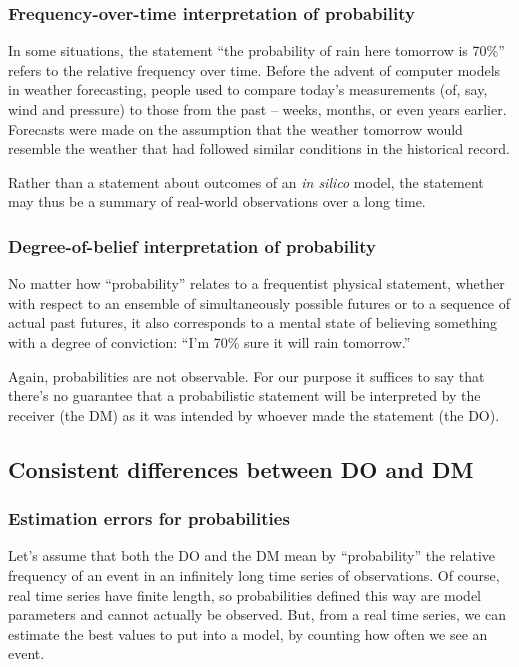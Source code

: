 \documentclass[12pt,letter,timesnewroman]{article}
\newcommand{\seclabel}[1]{\label{sec:#1}}
\begin{document}
\subsubsection*{Frequency-over-time interpretation of probability}
In some situations, the statement ``the probability of rain here tomorrow is 70\%'' refers to the relative frequency over time. Before the advent of computer models in weather forecasting, people used to compare today's measurements (of, say, wind and pressure) to those from the past -- weeks, months, or even years earlier. Forecasts were made on the assumption that the weather tomorrow would resemble the weather that had followed similar conditions in the historical record.

Rather than a statement about outcomes of an \textit{in silico} model, the statement may thus be a summary of real-world observations over a long time.

\subsubsection*{Degree-of-belief interpretation of probability}
No matter how ``probability'' relates to a frequentist physical statement, whether with respect to an ensemble of simultaneously possible futures or to a sequence of actual past futures, it also corresponds to a mental state of believing something with a degree of conviction: 
``I'm 70\% sure it will rain tomorrow.''

Again, probabilities are not observable.
For our purpose it suffices to say that there's no guarantee that a probabilistic statement will be interpreted by the receiver (the DM) as it was intended by whoever made the statement (the DO).

\subsection{Consistent differences between DO and DM \seclabel{condition2}}

\subsubsection*{Estimation errors for probabilities}
Let's assume that both the DO and the DM mean by ``probability'' the relative frequency of an event in an infinitely long time series of observations. Of course, real time series have finite length, so probabilities defined this way are model parameters and cannot actually be observed. But, from a real time series, we can estimate the best values to put into a model, by counting how often we see an event.
\end{document}
